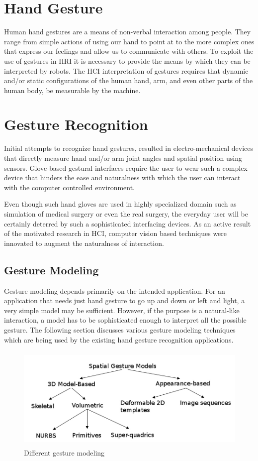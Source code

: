 \section{Hand Gesture} Human hand gestures are a means of non-verbal interaction among people. They range from simple actions of using our hand to point at to the more complex ones that express our feelings and allow us to communicate with others. To exploit the use of gestures in HRI it is necessary to provide the means by which they can be interpreted by robots. The HCI interpretation of gestures requires that dynamic and/or static configurations of the human hand, arm, and even other parts of the human body, be measurable by the machine. 

\section{Gesture Recognition} Initial attempts to recognize hand gestures, resulted in electro-mechanical devices that directly measure hand and/or arm joint angles and spatial position using sensors. Glove-based gestural interfaces require the user to wear such a complex device that hinders the ease and naturalness with which the user can interact with the computer controlled environment. 

Even though such hand gloves are used in highly specialized domain such as simulation of medical surgery or even the real surgery, the everyday user will be certainly deterred by such a sophisticated interfacing devices. As an active result of the motivated research in HCI, computer vision based techniques were innovated to augment the naturalness of interaction.

\subsection{Gesture Modeling} Gesture modeling depends primarily on the intended application. For an application that needs just hand gesture to go up and down or left and light, a very simple model may be sufficient. However, if the purpose is a natural-like interaction, a model has to be sophisticated enough to interpret all the possible gesture. The following section discusses various gesture modeling techniques which are being used by the existing hand gesture recognition applications. 

\begin{figure}
	[h] \centering 
	\includegraphics[height=5cm]{figures/ges-model.png} 
	\caption{Different gesture modeling} 
	\label{fig:ges:model} 
\end{figure}

